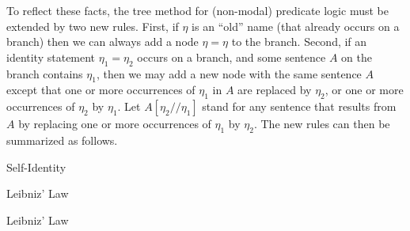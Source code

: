 To reflect these facts, the tree method for (non-modal) predicate logic must be
extended by two new rules. First, if $\eta$ is an ``old'' name (that already
occurs on a branch) then we can always add a node $\eta=\eta$ to the branch.
Second, if an identity statement $\eta_1=\eta_2$ occurs on a branch, and some
sentence $A$ on the branch contains $\eta_1$, then we may add a new node with
the same sentence $A$ except that one or more occurrences of $\eta_1$ in $A$ are
replaced by $\eta_2$, or one or more occurrences of $\eta_2$ by $\eta_1$. Let
$A[\eta_2//\eta_1]$ stand for any sentence that results from $A$ by replacing
one or more occurrences of $\eta_1$ by $\eta_2$. The new rules can then be
summarized as follows.

\bigskip
\begin{center}
  \begin{minipage}[t]{0.3\textwidth} \centering

    Self-Identity
    
  \end{minipage}
  \begin{minipage}[t]{0.3\textwidth} \centering
    Leibniz' Law
    \bigskip

  \end{minipage}
  \begin{minipage}[t]{0.3\textwidth} \centering
    Leibniz' Law
    \bigskip

  \end{minipage}
  
\end{center}


